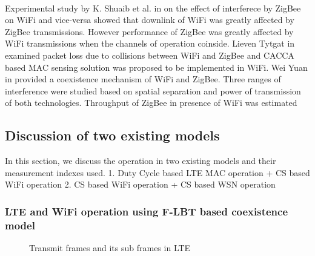\documentclass[a4paper]{article}
\begin{document}
	\paragraph{}
	Experimental study by K. Shuaib et al. in \cite{1666534} on the effect of interferece by {ZigBee} on {WiFi} and vice-versa showed that downlink of {WiFi} was greatly affected by {ZigBee} transmissions. However performance of {ZigBee} was greatly affected by {WiFi} transmissions when the channels of operation coinside. Lieven Tytgat in \cite{Tytgat2012} examined packet loss due to collisions between {WiFi} and {ZigBee} and {CACCA} based {MAC} sensing solution was proposed to be implemented in {WiFi}. Wei Yuan in \cite{4436237} provided a coexistence mechanism of {WiFi} and {ZigBee}. Three ranges of interference were studied based on spatial separation and power of transmission of both technologies. Throughput of {ZigBee} in presence of {WiFi} was estimated

\subsection{Discussion of two existing models}
In this section, we discuss the operation in two existing models and their measurement indexes used.
1. Duty Cycle based LTE {MAC} operation + CS based {WiFi} operation
2. CS based {WiFi} operation + CS based {WSN} operation
\subsubsection{{LTE} and {WiFi} operation using {F-LBT} based coexistence model}
\begin{figure}
\caption{Transmit frames and its sub frames in LTE}
\label{lteframe}
\end{figure}
\end{document}
